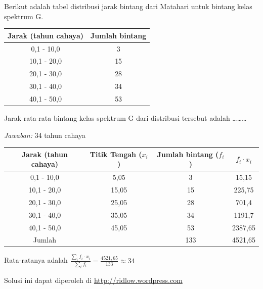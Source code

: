 \documentclass[11pt,fleqn]{exam}
\begin{document}
\begin{questions}
\question Berikut adalah tabel distribusi jarak bintang dari Matahari untuk bintang kelas spektrum G.


\begin{center}
\begin{tabular}{|c|c|}
\hline 
Jarak (tahun  cahaya) & Jumlah bintang \\ 
\hline 
0,1 - 10,0 & 3 \\ 
\hline 
10,1 - 20,0 & 15 \\ 
\hline 
20,1 - 30,0 & 28 \\ 
\hline 
30,1 - 40,0 & 34 \\ 
\hline 
40,1 - 50,0 & 53 \\ 
\hline 
\end{tabular} 
\end{center}

Jarak rata-rata bintang kelas spektrum G dari distribusi tersebut adalah \ldots\ldots\ldots

\textit{Jawaban: } 34 tahun cahaya\\

\begin{center}
\begin{tabular}{|c|c|c|c|}
\hline 
Jarak (tahun  cahaya) & Titik Tengah ($x_i$) & Jumlah bintang ($f_i$) & $f_i \cdot x_i$ \\ 
\hline 
0,1 - 10,0 & 5,05 & 3 & 15,15\\ 
\hline 
10,1 - 20,0 & 15,05 & 15 & 225,75\\ 
\hline 
20,1 - 30,0 & 25,05 & 28 & 701,4\\ 
\hline 
30,1 - 40,0 & 35,05 & 34 & 1191,7\\ 
\hline 
40,1 - 50,0 & 45,05 & 53 & 2387,65\\ 
\hline 
Jumlah & & 133 & 4521,65\\
\hline
\end{tabular} 
\end{center}

Rata-ratanya adalah $\frac{\sum_i f_i \cdot x_i}{\sum_i f_i} = \frac{4521,65}{133} \approx 34$

\end{questions}


\vspace{2cm}
\begin{flushright}
Solusi ini dapat diperoleh di \url{http://ridlow.wordpress.com}
\end{flushright}
\end{document}
